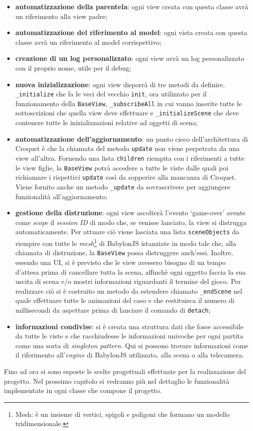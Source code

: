 \begin{itemize}
    \item \textbf{automatizzazione della parentela}: ogni view creata con questa classe avrà un riferimento alla view padre;
    \item \textbf{automatizzazione del riferimento al model}: ogni vista creata con questa classe avrà un riferimento al model corrispettivo;
    \item \textbf{creazione di un log personalizzato}: ogni view avrà un log personalizzato con il proprio nome, utile per il debug;
    \item \textbf{nuova inizializzazione}: ogni view disporrà di tre metodi da definire, \texttt{\_initialize} che fa le veci del vecchio \texttt{init}, ora utilizzato per il funzionamento
    della \texttt{BaseView}, \texttt{\_subscribeAll} in cui vanno inserite tutte le sottoscrizioni che quella view deve effettuare e \texttt{\_initializeScene} che deve contenere tutte le
    inizializzazioni relative ad oggetti di scena;
    \item \textbf{automatizzazione dell'aggiornamento}: un punto cieco dell'architettura di Croquet è che la chiamata del metodo \texttt{update} non viene perpetrata da una view all'altra.
    Fornendo una lista \texttt{children} riempita con i riferimenti a tutte le view figlie, la \texttt{BaseView} potrà accedere a tutte le viste dalle quali poi richiamare i rispettivi
    \texttt{update} così da sopperire alla mancanza di Croquet. Viene fornito anche un metodo \texttt{\_update} da sovrascrivere per aggiungere funzionalità all'aggiornamento;
    \item \textbf{gestione della distruzione}: ogni view ascolterà l'evento `game-over' avente come \textit{scope} il \textit{session ID} di modo che, se venisse lanciato, la view
    si distrugga automaticamente. Per attuare ciò viene lasciata una lista \texttt{sceneObjects} da riempire con tutte le \textit{mesh}\footnote{Mesh: è un insieme di vertici, spigoli e 
    poligoni che formano un modello tridimensionale.} di BabylonJS istanziate in modo tale che,
    alla chiamata di distruzione, la \texttt{BaseView} possa distruggere anch'essi. Inoltre, essendo una UI, si è previsto che le view avessero bisogno di un tempo d'attesa prima di 
    cancellare tutta la scena, affinchè ogni oggetto faccia la sua uscita di scena e/o mostri informazioni riguardanti il termine del gioco. Per realizzare ciò si è costruito un metodo 
    da estendere chiamato \texttt{\_endScene} nel quale effettuare tutte le animazioni del caso e che restituisca il numero di millisecondi da aspettare prima di lanciare il comando di 
    \texttt{detach};
    \item \textbf{informazioni condivise}: si è creata una struttura dati che fosse accessibile da tutte le viste e che racchiudesse le informazioni univoche per ogni partita come una sorta
    di \textit{singleton pattern}. Qui si possono trovare informazioni come il riferimento all'\textit{engine} di BabylonJS utilizzato, alla scena o alla telecamera.
\end{itemize}
Fino ad ora si sono esposte le scelte progettuali effettuate per la realizzazione del progetto. Nel prossimo capitolo si vedranno più nel dettaglio le funzionalità implementate in ogni
classe che compone il progetto.